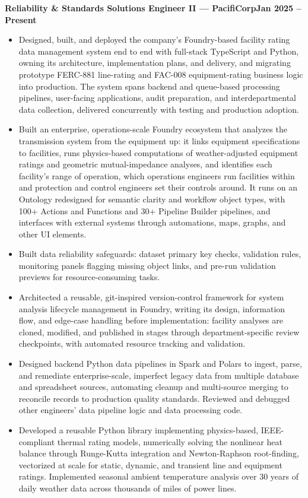 \documentclass[10pt, letterpaper]{article}
\newcommand{\jobline}[2]{%
  \vspace{5pt}%
  \noindent\textbf{#1}\hfill\textbf{#2}\par%
  \vspace{1pt}%
}
\newenvironment{rlist}{%
  \begin{itemize}[leftmargin=1.4em, itemsep=1pt, topsep=2pt, parsep=0pt]%
}{%
  \end{itemize}%
}
\begin{document}
\jobline{Reliability \& Standards Solutions Engineer II --- PacifiCorp}{Jan 2025 -- Present}
\begin{rlist}
  \item Designed, built, and deployed the company's Foundry-based facility rating data management system end to end with full-stack TypeScript and Python, owning its architecture, implementation plans, and delivery, and migrating prototype FERC-881 line-rating and FAC-008 equipment-rating business logic into production. The system spans backend and queue-based processing pipelines, user-facing applications, audit preparation, and interdepartmental data collection, delivered concurrently with testing and production adoption.
  \item Built an enterprise, operations-scale Foundry ecosystem that analyzes the transmission system from the equipment up: it links equipment specifications to facilities, runs physics-based computations of weather-adjusted equipment ratings and geometric mutual-impedance analyses, and identifies each facility's range of operation, which operations engineers run facilities within and protection and control engineers set their controls around. It runs on an Ontology redesigned for semantic clarity and workflow object types, with 100+ Actions and Functions and 30+ Pipeline Builder pipelines, and interfaces with external systems through automations, maps, graphs, and other UI elements.
  \item Built data reliability safeguards: dataset primary key checks, validation rules, monitoring panels flagging missing object links, and pre-run validation previews for resource-consuming tasks.
  \item Architected a reusable, git-inspired version-control framework for system analysis lifecycle management in Foundry, writing its design, information flow, and edge-case handling before implementation: facility analyses are cloned, modified, and published in stages through department-specific review checkpoints, with automated resource tracking and validation.
  \item Designed backend Python data pipelines in Spark and Polars to ingest, parse, and remediate enterprise-scale, imperfect legacy data from multiple database and spreadsheet sources, automating cleanup and multi-source merging to reconcile records to production quality standards. Reviewed and debugged other engineers' data pipeline logic and data processing code.
  \item Developed a reusable Python library implementing physics-based, IEEE-compliant thermal rating models, numerically solving the nonlinear heat balance through Runge-Kutta integration and Newton-Raphson root-finding, vectorized at scale for static, dynamic, and transient line and equipment ratings. Implemented seasonal ambient temperature analysis over 30 years of daily weather data across thousands of miles of power lines.

\end{rlist}
\end{document}

